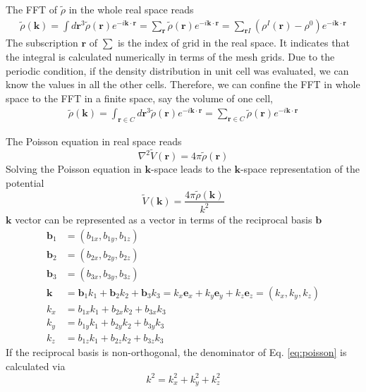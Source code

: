 \documentclass{article}
\begin{document}
The FFT of $\tilde{\rho}$ in the whole real space reads
\begin{align}
  \tilde{\rho}(\mathbf{k})
  =\int d\mathbf{r}^3 \tilde{\rho}(\mathbf{r}) e^{-i\mathbf{k}\cdot\mathbf{r}}
  =\sum_{\mathbf{r}} \tilde{\rho}(\mathbf{r})
  e^{-i\mathbf{k}\cdot \mathbf{r}}
  =\sum_{\mathbf{r} I}(\rho^I(\mathbf{r}) - \rho^0)
  e^{-i\mathbf{k}\cdot \mathbf{r}}
  \label{}
\end{align}
The subscription $\mathbf{r}$ of $\sum$ is the index of grid in the real
space.  It indicates that the integral is calculated numerically in
terms of the mesh grids.
Due to the periodic condition,
if the density distribution in unit cell was evaluated,
we can know the values in all the other cells.
Therefore, we can confine the FFT in whole space to the FFT in a finite space,
say the volume of one cell,
\begin{align}
  \tilde{\rho}(\mathbf{k})
  =\int_{\mathbf{r}\in C} d\mathbf{r}^3
  \tilde{\rho}(\mathbf{r}) e^{-i\mathbf{k}\cdot\mathbf{r}}
  =\sum_{\mathbf{r}\in C}
  \tilde{\rho}(\mathbf{r}) e^{-i\mathbf{k}\cdot \mathbf{r}}
  \label{eq:rhok:unitcell}
\end{align}

The Poisson equation in real space reads
\begin{equation}
  \nabla^2 \tilde{V}(\mathbf{r}) = 4\pi \tilde{\rho}(\mathbf{r})
  \label{eq:poisson}
\end{equation}
Solving the Poisson equation in $\mathbf{k}$-space leads to
the $\mathbf{k}$-space representation of the potential
\begin{equation}
  \tilde{V}(\mathbf{k})=\frac{4\pi\tilde{\rho}(\mathbf{k})}{k^2}
  \label{}
\end{equation}
$\mathbf{k}$ vector can be represented as a vector in terms of the reciprocal
basis $\mathbf{b}$
\begin{align}
  \mathbf{b}_1 &= (b_{1x},b_{1y},b_{1z})\\
  \mathbf{b}_2 &= (b_{2x},b_{2y},b_{2z})\\
  \mathbf{b}_3 &= (b_{3x},b_{3y},b_{3z})\\
  \mathbf{k}
  &=\mathbf{b}_1 k_1 + \mathbf{b}_2 k_2 + \mathbf{b}_3 k_3
  = k_x \mathbf{e}_x + k_y \mathbf{e}_y + k_z \mathbf{e}_z
  = (k_x, k_y, k_z) \\
  k_x &= b_{1x}k_1 + b_{2x}k_2 + b_{3x}k_3 \\
  k_y &= b_{1y}k_1 + b_{2y}k_2 + b_{3y}k_3 \\
  k_z &= b_{1z}k_1 + b_{2z}k_2 + b_{3z}k_3
  \label{}
\end{align}
If the reciprocal basis is non-orthogonal,
the denominator of Eq. \eqref{eq:poisson} is calculated via
\begin{equation}
  k^2 = k_x^2 + k_y^2 + k_z^2
  \label{}
\end{equation}
\end{document}

